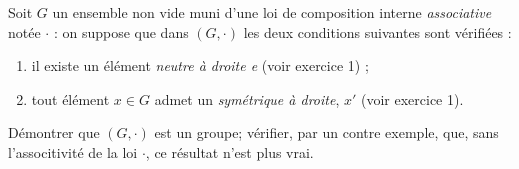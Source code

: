 Soit $G$ un ensemble non vide muni d'une loi de composition interne \textit{associative} notée $\cdot$ : on suppose que dans $(G,\cdot)$ les deux conditions suivantes sont vérifiées : 
\begin{enumerate}[label=\arabic*°]
    \item il existe un élément \textit{neutre à droite e} (voir exercice 1) ;
    \item tout élément $x \in G$ admet un \textit{symétrique à droite}, $x'$ (voir exercice 1).
\end{enumerate}

Démontrer que $(G,\cdot)$ est un groupe; vérifier, par un contre exemple, que, sans l'associtivité de la loi $\cdot$, ce résultat n'est plus vrai.